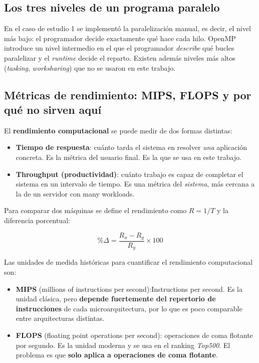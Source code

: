 \subsection{Los tres niveles de un programa paralelo}

En el caso de estudio 1 se implementó la paralelización manual, es decir, el nivel más bajo: el programador decide exactamente qué hace cada hilo. OpenMP introduce un nivel intermedio en el que el programador \emph{describe} qué bucles paralelizar y el \textit{runtime} decide el reparto. Existen además niveles más altos (\textit{tasking}, \textit{worksharing}) que no se usaron en este trabajo.

\subsection{Métricas de rendimiento: MIPS, FLOPS y por qué no sirven aquí}

El \textbf{rendimiento computacional} se puede medir de dos formas distintas:

\begin{itemize}
    \item \textbf{Tiempo de respuesta}: cuánto tarda el sistema en resolver \emph{una} aplicación concreta. Es la métrica del usuario final. Es la que se usa en este trabajo.
    \item \textbf{Throughput (productividad)}: cuánto trabajo es capaz de completar el sistema en un intervalo de tiempo. Es una métrica del \emph{sistema}, más cercana a la de un servidor con many workloads.
\end{itemize}

Para comparar dos máquinas se define el rendimiento como $R = 1/T$ y la diferencia porcentual:

\[
\%\Delta = \frac{R_x - R_y}{R_y} \times 100
\]

Las unidades de medida históricas para cuantificar el rendimiento computacional son:

\begin{itemize}
    \item \textbf{MIPS} (millions of instructions per second):Instructions per second. Es la unidad clásica, pero \textbf{depende fuertemente del repertorio de instrucciones} de cada microarquitectura, por lo que es poco comparable entre arquitecturas distintas.
    \item \textbf{FLOPS} (floating point operations per second): operaciones de coma flotante por segundo. Es la unidad moderna y se usa en el ranking \textit{Top500}. El problema es que \textbf{solo aplica a operaciones de coma flotante}.
\end{itemize}

